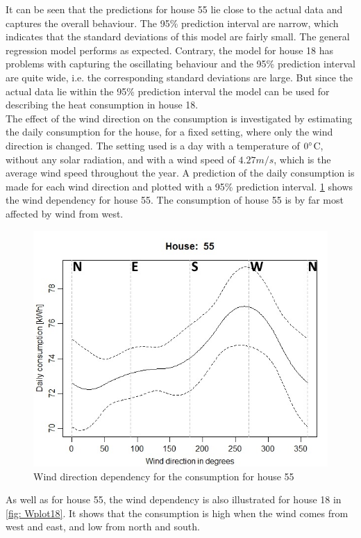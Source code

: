 \noindent It can be seen that the predictions for house 55 lie close to the actual data and captures the overall behaviour. The 95\% prediction interval are narrow, which indicates that the standard deviations of this model are fairly small. The general regression model performs as expected. Contrary, the model for house 18 has problems with capturing the oscillating behaviour and the 95\% prediction interval are quite wide, i.e. the corresponding standard deviations are large. But since the actual data lie within the 95\% prediction interval the model can be used for describing the heat consumption in house 18. \\

\noindent The effect of the wind direction on the consumption is investigated by estimating the daily consumption for the house, for a fixed setting, where only the wind direction is changed. The setting used is a day with a temperature of $0 \degree$C, without any solar radiation, and with a wind speed of $4.27 m/s$, which is the average wind speed throughout the year. A prediction of the daily consumption is made for each wind direction and plotted with a 95\% prediction interval. \cref{fig: Wplot55} shows the wind dependency for house 55. The consumption of house 55 is by far most affected by wind from west.
\begin{figure}
    \centering
    \includegraphics[width=.8\textwidth]{../../../figures/Wplot55.jpeg}
    \caption{Wind direction dependency for the consumption for house 55}
    \label{fig: Wplot55}
\end{figure}
As well as for house 55, the wind dependency is also illustrated for house 18 in \cref{fig: Wplot18}. It shows that the consumption is high when the wind comes from west and east, and low from north and south.
